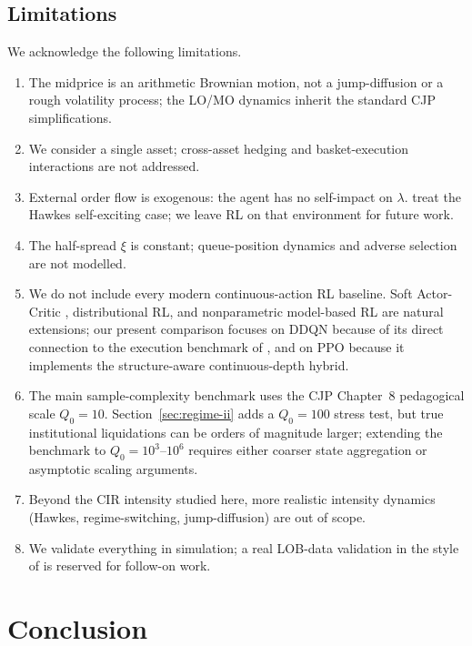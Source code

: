 \documentclass[]{interact}
\theoremstyle{plain}
\theoremstyle{definition}
\theoremstyle{remark}
\newcommand{\1}[1]{\mathbf{1}_{\{#1\}}}
\begin{document}
\subsection{Limitations}\label{sec:limitations}
We acknowledge the following limitations.
\begin{enumerate}
\item The midprice is an arithmetic Brownian motion, not a jump-diffusion or a rough volatility process; the LO/MO dynamics inherit the standard CJP simplifications.
\item We consider a single asset; cross-asset hedging and basket-execution interactions are not addressed.
\item External order flow is exogenous: the agent has no self-impact on $\lambda$. \citet{alfonsi2016hawkes} treat the Hawkes self-exciting case; we leave RL on that environment for future work.
\item The half-spread $\xi$ is constant; queue-position dynamics and adverse selection are not modelled.
\item We do not include every modern continuous-action RL baseline. Soft Actor-Critic \citep{haarnoja2018sac}, distributional RL, and nonparametric model-based RL are natural extensions; our present comparison focuses on DDQN because of its direct connection to the execution benchmark of \citet{ninglinjaimungal2021}, and on PPO because it implements the structure-aware continuous-depth hybrid.
\item The main sample-complexity benchmark uses the CJP Chapter~8 pedagogical scale $Q_0=10$. Section~\ref{sec:regime-ii} adds a $Q_0=100$ stress test, but true institutional liquidations can be orders of magnitude larger; extending the benchmark to $Q_0=10^3$--$10^6$ requires either coarser state aggregation or asymptotic scaling arguments.
\item Beyond the CIR intensity studied here, more realistic intensity dynamics (Hawkes, regime-switching, jump-diffusion) are out of scope.
\item We validate everything in simulation; a real LOB-data validation in the style of \citet{karpe2020abides} is reserved for follow-on work.
\end{enumerate}

\section{Conclusion}\label{sec:conclusion}
\end{document}
